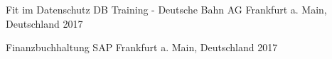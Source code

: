 

\begin{cvhonors}

  \cvhonor
    {Fit im Datenschutz} %
    {DB Training - Deutsche Bahn AG} %
    {Frankfurt a. Main, Deutschland} %
    {2017} %
    
  \cvhonor
    {Finanzbuchhaltung} %
    {SAP} %
    {Frankfurt a. Main, Deutschland} %
    {2017} %

\end{cvhonors}
